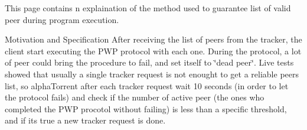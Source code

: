 This page contains n explaination of the method used to guarantee list of valid peer during program execution.

\begin{DoxyParagraph}{Motivation and Specification}
After receiving the list of peers from the tracker, the client start executing the P\+WP protocol with each one. During the protocol, a lot of peer could bring the procedure to fail, and set itself to \char`\"{}dead peer\char`\"{}. Live tests showed that usually a single tracker request is not enought to get a reliable peers list, so alpha\+Torrent after each tracker request wait 10 seconds (in order to let the protocol fails) and check if the number of active peer (the ones who completed the P\+WP procotol without failing) is less than a specific threshold, and if it\textquotesingle{}s true a new tracker request is done. 
\end{DoxyParagraph}
